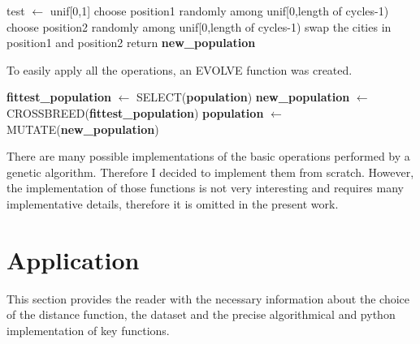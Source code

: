 \documentclass{article}
\begin{document}
\begin{algorithm}[H]
    \begin{algorithmic}[1]
        \State test $\leftarrow$ unif[0,1]
        	\State choose position1 randomly among unif[0,length of cycles-1)
  			\State choose position2 randomly among unif[0,length of cycles-1)
  			\State swap the cities in position1 and position2
        \EndIf
       \EndFor
        \State return \textbf{new\_population}
       \EndFunction
\end{algorithmic}
\end{algorithm}
\noindent To easily apply all the operations, an EVOLVE function was created.

\begin{algorithm}[H]
    \begin{algorithmic}[1]
        \State \textbf{fittest\_population} $\leftarrow$ SELECT(\textbf{population})
        \State \textbf{new\_population} $\leftarrow$ CROSSBREED(\textbf{fittest\_population})
       \State \textbf{population} $\leftarrow$ MUTATE(\textbf{new\_population})
       \EndFunction
\end{algorithmic}
\end{algorithm}

\noindent There are many possible implementations of the basic operations performed by a genetic algorithm. Therefore I decided to implement them from scratch. However, the implementation of those functions is not very interesting and requires many implementative details, therefore it is omitted in the present work.

\section{Application} 
This section provides the reader with the necessary information about the choice of the distance function, the dataset and the precise algorithmical and python implementation of key functions.
\end{document}
